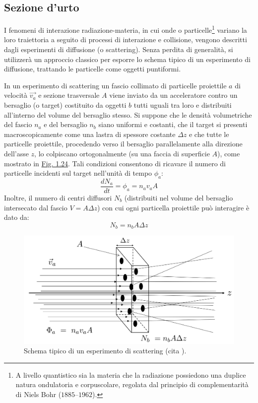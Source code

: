 \documentclass[12pt,a4paper,twoside]{report}
\begin{document}
	\subsection{Sezione d'urto}\label{sec:sezione_urto}
	I fenomeni di interazione radiazione-materia, in cui onde o particelle\footnote{A livello quantistico sia la materia che la radiazione possiedono una duplice natura ondulatoria e corpuscolare, regolata dal principio di complementarità di Niels Bohr ($1885$--$1962$).} variano la loro traiettoria a seguito di processi di interazione e collisione, vengono descritti dagli esperimenti di diffusione (o scattering). Senza perdita di generalità, si utilizzerà un approccio classico per esporre lo schema tipico di un esperimento di diffusione, trattando le particelle come oggetti puntiformi.
	
	In un esperimento di scattering un fascio collimato di particelle proiettile $a$ di velocità $\vec{v_a}$ e sezione trasversale $A$ viene inviato da un acceleratore contro un bersaglio (o target) costituito da oggetti $b$ tutti uguali tra loro e distribuiti all'interno del volume del bersaglio stesso. Si suppone che le densità volumetriche del fascio $n_a$ e del bersaglio $n_b$ siano uniformi e costanti, che il target si presenti macroscopicamente come una lastra di spessore costante $\Delta z$ e che tutte le particelle proiettile, procedendo verso il bersaglio parallelamente alla direzione dell'asse $z$, lo colpiscano ortogonalmente (su una faccia di superficie $A$), come mostrato in \hyperref[fig:scattering]{Fig. 1.24}. Tali condizioni consentono di ricavare il numero di particelle incidenti sul target nell'unità di tempo $\phi_a$:
	\begin{equation}
		\frac{dN_a}{dt}=\phi_a=n_av_aA
		\label{eq:scattering1}
	\end{equation}
	Inoltre, il numero di centri diffusori $N_b$ (distribuiti nel volume del bersaglio intersecato dal fascio $V=A\Delta z$) con cui ogni particella proiettile può interagire è dato da:
	\begin{equation}
		N_b=n_bA\Delta z
		\label{eq:scattering2}
	\end{equation}
	\begin{figure}[H]
		\centering
		\includegraphics[width=0.9\linewidth]{scattering.jpg}
		\caption{Schema tipico di un esperimento di scattering (cita
			).}
		\label{fig:scattering}
	\end{figure}
\end{document}
